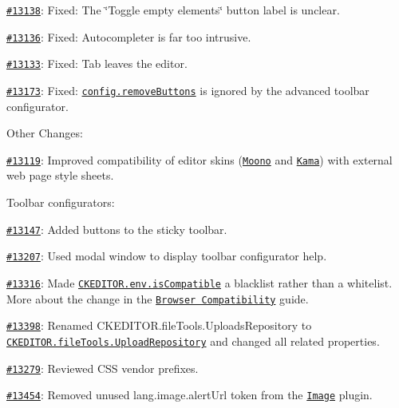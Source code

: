 \begin{DoxyItemize}
\begin{DoxyItemize}
\item \href{http://dev.ckeditor.com/ticket/13138}{\tt \#13138}\+: Fixed\+: The \char`\"{}\+Toggle empty elements\char`\"{} button label is unclear.
\item \href{http://dev.ckeditor.com/ticket/13136}{\tt \#13136}\+: Fixed\+: Autocompleter is far too intrusive.
\item \href{http://dev.ckeditor.com/ticket/13133}{\tt \#13133}\+: Fixed\+: Tab leaves the editor.
\item \href{http://dev.ckeditor.com/ticket/13173}{\tt \#13173}\+: Fixed\+: \href{http://docs.ckeditor.com/#!/api/CKEDITOR.config-cfg-removeButtons}{\tt {\ttfamily config.\+remove\+Buttons}} is ignored by the advanced toolbar configurator.
\end{DoxyItemize}
\end{DoxyItemize}

Other Changes\+:


\begin{DoxyItemize}
\item \href{http://dev.ckeditor.com/ticket/13119}{\tt \#13119}\+: Improved compatibility of editor skins (\href{http://ckeditor.com/addon/moono}{\tt Moono} and \href{http://ckeditor.com/addon/kama}{\tt Kama}) with external web page style sheets.
\item Toolbar configurators\+:
\begin{DoxyItemize}
\item \href{http://dev.ckeditor.com/ticket/13147}{\tt \#13147}\+: Added buttons to the sticky toolbar.
\item \href{http://dev.ckeditor.com/ticket/13207}{\tt \#13207}\+: Used modal window to display toolbar configurator help.
\end{DoxyItemize}
\item \href{http://dev.ckeditor.com/ticket/13316}{\tt \#13316}\+: Made \href{http://docs.ckeditor.com/#!/api/CKEDITOR.env-property-isCompatible}{\tt {\ttfamily C\+K\+E\+D\+I\+T\+O\+R.\+env.\+is\+Compatible}} a blacklist rather than a whitelist. More about the change in the \href{http://docs.ckeditor.com/#!/guide/dev_browsers}{\tt Browser Compatibility} guide.
\item \href{http://dev.ckeditor.com/ticket/13398}{\tt \#13398}\+: Renamed {\ttfamily C\+K\+E\+D\+I\+T\+O\+R.\+file\+Tools.\+Uploads\+Repository} to \href{http://docs.ckeditor.com/#!/api/CKEDITOR.fileTools.uploadRepository}{\tt {\ttfamily C\+K\+E\+D\+I\+T\+O\+R.\+file\+Tools.\+Upload\+Repository}} and changed all related properties.
\item \href{http://dev.ckeditor.com/ticket/13279}{\tt \#13279}\+: Reviewed C\+SS vendor prefixes.
\item \href{http://dev.ckeditor.com/ticket/13454}{\tt \#13454}\+: Removed unused {\ttfamily lang.\+image.\+alert\+Url} token from the \href{http://ckeditor.com/addon/image}{\tt Image} plugin.
\end{DoxyItemize}

